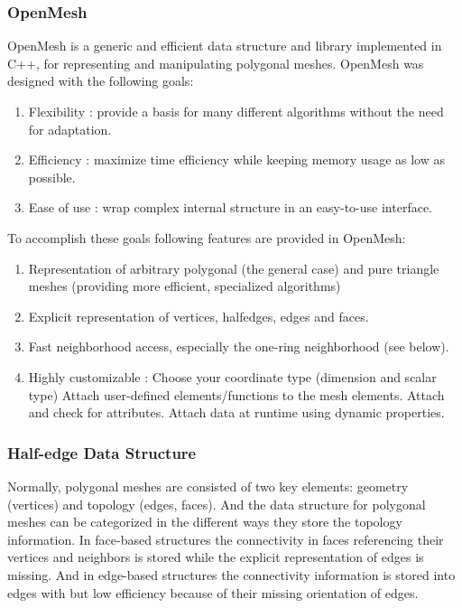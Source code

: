 \subsubsection{OpenMesh}
\label{section:openmesh}
OpenMesh is a generic and efficient data structure and library implemented in C++, for representing and manipulating polygonal meshes. OpenMesh was designed with the following goals: 
\begin{enumerate}
\item
Flexibility : provide a basis for many different algorithms without the need for adaptation.
\item
Efficiency : maximize time efficiency while keeping memory usage as low as possible.
\item
Ease of use : wrap complex internal structure in an easy-to-use interface.
\end{enumerate}
To accomplish these goals following features are provided in OpenMesh:
\begin{enumerate}
\item
Representation of arbitrary polygonal (the general case) and pure triangle meshes (providing more efficient, specialized algorithms)
\item
Explicit representation of vertices, halfedges, edges and faces.
\item
Fast neighborhood access, especially the one-ring neighborhood (see below).
\item
Highly customizable :
\subitem 
Choose your coordinate type (dimension and scalar type)
\subitem
Attach user-defined elements/functions to the mesh elements.
\subitem
Attach and check for attributes.
\subitem
Attach data at runtime using dynamic properties.
\end{enumerate} 

\subsubsection{Half-edge Data Structure}
\label{section:heDataStruct}
Normally, polygonal meshes are consisted of two key elements: geometry (vertices) and topology (edges, faces). And the data structure for polygonal meshes can be categorized in the different ways they store the topology information. In face-based structures the connectivity in faces referencing their vertices and neighbors is stored while the explicit representation of edges is missing. And in edge-based structures the connectivity information is stored into edges with but low efficiency because of their missing orientation of edges.  \\

